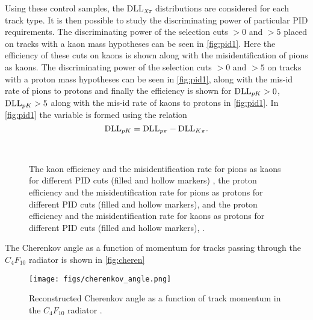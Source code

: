 Using these control samples, the $\text{DLL}_{X\pi}$ distributions are considered for each track type. It is then possible to study the discriminating power of particular PID requirements. The discriminating power of the selection cuts \dllkpi$>0$ and \dllkpi$>5$ placed on tracks with a kaon mass hypotheses can be seen in \autoref{fig:pid1}\protect{}. Here the efficiency of these cuts on kaons is shown along with the misidentification of pions as kaons.
 The discriminating power of the selection cuts \dllppi$>0$ and \dllppi$>5$ on tracks with a proton mass hypotheses can be seen in \autoref{fig:pid1}\protect{}, along with the mis-id rate of pions to protons and finally the efficiency is shown for $\mathrm{DLL}_{{p}{K}}>0$, $\mathrm{DLL}_{{p}{K}}>5$ along with the mis-id rate of kaons to protons in \autoref{fig:pid1}\protect{}. In \autoref{fig:pid1}\protect{} the variable \dllpk is formed using the relation
\begin{equation}
  \mathrm{DLL}_{{p}{K}} = \mathrm{DLL}_{{p}{\pi}} - \mathrm{DLL}_{{K}{\pi}}.
\end{equation}

\begin{figure}[h!]
  \centering
      \\
      \caption{The kaon efficiency and the misidentification rate for pions as kaons for different PID cuts (filled and hollow markers) \protect{}, the proton efficiency and the misidentification rate for pions as protons for different PID cuts (filled and hollow markers), \protect{} and the proton efficiency and the misidentification rate for kaons as protons for different PID cuts (filled and hollow markers), \protect{} \cite{LHCb-DP-2012-003}.}
  \label{fig:pid1}
\end{figure}

The Cherenkov angle as a function of momentum for tracks passing through the $C_{4}F_{10}$ radiator is shown in \autoref{fig:cheren}
\begin{figure}[h!]
  \centering
  \texttt{[image: figs/cherenkov\_angle.png]} 
  \caption{Reconstructed Cherenkov angle as a function of track momentum in the $C_{4}F_{10}$ radiator \cite{LHCb-DP-2012-003}.
  }
  \label{fig:cheren}
\end{figure}





